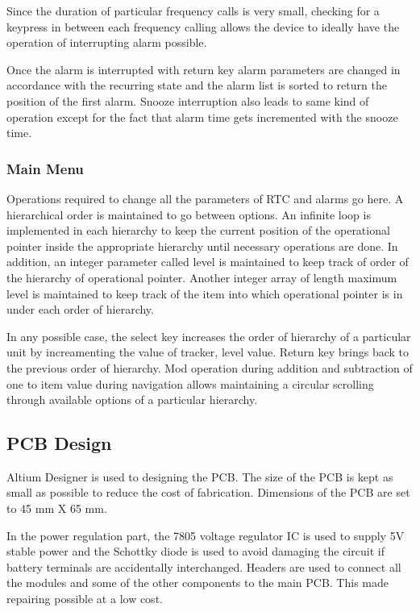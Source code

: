 \documentclass[12pt,twocolumn]{article}
\begin{document}
Since the duration of particular frequency calls is very small, checking for a keypress in 
between each frequency calling allows the device to ideally have the operation of interrupting 
alarm possible. 
        
Once the alarm is interrupted with return key alarm parameters are changed in accordance 
with the recurring state and the alarm list is sorted to return the position of the first alarm.
Snooze interruption also leads to same kind of operation except for the fact that alarm time gets
incremented with the snooze time.
        \subsubsection{Main Menu}
Operations required to change all the parameters of RTC and alarms go here. A hierarchical order
is maintained to go between options. An infinite loop is implemented in each hierarchy to keep the
current position of the operational pointer inside the appropriate hierarchy until necessary operations
are done. In addition, an integer parameter called level is maintained to keep track of order of the
hierarchy of operational pointer. Another integer array of length maximum level is maintained to keep track
of the item into which operational pointer is in under each order of hierarchy.

In any possible case, the select key increases the order of hierarchy of a particular unit by
increamenting the value of tracker, level value. Return key brings back to the previous order
of hierarchy. Mod operation during addition and subtraction of one to item value during navigation
allows maintaining a circular scrolling through available options of a particular hierarchy.

    \subsection{PCB Design}
Altium Designer is used to designing the PCB. The size of the PCB is kept as small as possible to
reduce the cost of fabrication. Dimensions of the PCB are set to 45 mm X 65 mm.

In the power regulation part, the 7805 voltage regulator IC is used to supply 5V stable power and
the Schottky diode is used to avoid damaging the circuit if battery terminals are accidentally
interchanged. Headers are used to connect all the modules and some of the other components to the
main PCB. This made repairing possible at a low cost. 
    
\end{document}
